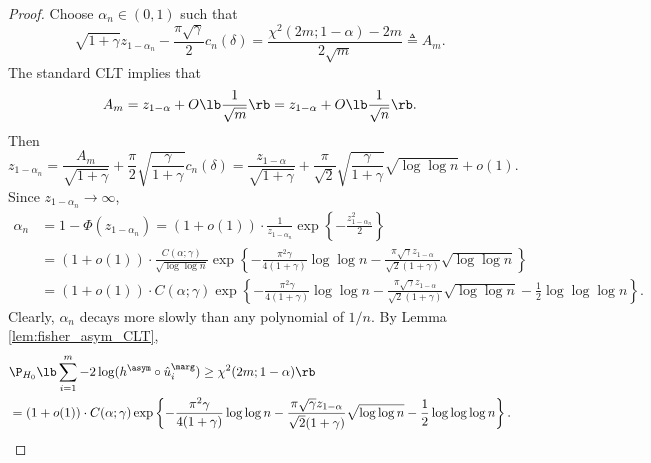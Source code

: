 \begin{proof}
  Choose $\alpha_n\in (0, 1)$ such that
  \[\sqrt{1 + \gamma}z_{1 - \alpha_{n}} - \frac{\pi\sqrt{\gamma}}{2} c_{n}(\delta) = \frac{\chi^2(2m; 1 - \alpha) - 2m}{2\sqrt{m}} \triangleq A_m.\]
  The standard CLT implies that
  \begin{equation}
    \label{eq:chi_normal_approx}
    A_{m} = z_{1 - \alpha} + O\lb\frac{1}{\sqrt{m}}\rb = z_{1 - \alpha} + O\lb\frac{1}{\sqrt{n}}\rb.
  \end{equation}
  Then
  \begin{equation}
    \label{eq:alphan}
    z_{1 - \alpha_{n}} = \frac{A_{m}}{\sqrt{1 + \gamma}} + \frac{\pi}{2}\sqrt{\frac{\gamma}{1 + \gamma}}c_{n}(\delta) = \frac{z_{1-\alpha}}{\sqrt{1+\gamma}} + \frac{\pi}{\sqrt{2}}\sqrt{\frac{\gamma}{1 + \gamma}}\sqrt{\log\log n} + o(1).
  \end{equation}
  Since $z_{1 - \alpha_{n}}\rightarrow \infty$,
  \begin{align*}
    \alpha_{n}
    &= 1 - \Phi(z_{1 - \alpha_{n}}) = (1 + o(1))\cdot \frac{1}{z_{1 - \alpha_{n}}}\exp\left\{-\frac{z_{1 - \alpha_{n}}^2}{2}\right\}\\
    & = (1 + o(1))\cdot \frac{C(\alpha; \gamma)}{\sqrt{\log \log n}}\exp\left\{-\frac{\pi^2 \gamma}{4(1 + \gamma)}\log\log n - \frac{\pi\sqrt{\gamma}z_{1-\alpha}}{\sqrt{2}(1 + \gamma)}\sqrt{\log \log n}\right\}\\
    & = (1 + o(1))\cdot C(\alpha; \gamma)\exp\left\{-\frac{\pi^2 \gamma}{4(1 + \gamma)}\log\log n - \frac{\pi\sqrt{\gamma}z_{1-\alpha}}{\sqrt{2}(1 + \gamma)}\sqrt{\log \log n} - \frac{1}{2}\log\log\log n\right\}.
  \end{align*}
  Clearly, $\alpha_{n}$ decays more slowly than any polynomial of $1/n$. By Lemma \ref{lem:fisher_asym_CLT},
  \begin{align*}
    &\P_{H_0}\lb\sum_{i=1}^{m} -2\log(h^\asym \circ \hat{u}_i^\marg)\ge \chi^2(2m; 1 - \alpha)\rb\\
    & = (1 + o(1))\cdot C(\alpha; \gamma)\exp\left\{-\frac{\pi^2 \gamma}{4(1 + \gamma)}\log\log n - \frac{\pi\sqrt{\gamma}z_{1-\alpha}}{\sqrt{2}(1 + \gamma)}\sqrt{\log \log n} - \frac{1}{2}\log\log\log n\right\}.
  \end{align*}
\end{proof}

